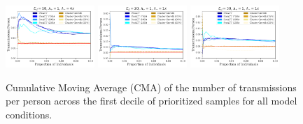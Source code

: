 \documentclass[a4paper,11pt]{article}
\begin{document}
\begin{figure}[!h]
\includegraphics[width=0.3\textwidth]{figs/results_efficacy_individual_SAMPLE-FIRSTART_STOPRATE-4x.pdf}
\includegraphics[width=0.3\textwidth]{figs/results_efficacy_individual_SAMPLE-FIRSTART_EXPDEGREE-20.pdf}
\includegraphics[width=0.3\textwidth]{figs/results_efficacy_individual_SAMPLE-FIRSTART_EXPDEGREE-30.pdf}\\
\caption{Cumulative Moving Average (CMA) of the number of transmissions per person across the first decile of prioritized samples for all model conditions.}\label{fig:cma-trans-individual-all}
\end{figure}

\clearpage
\end{document}
